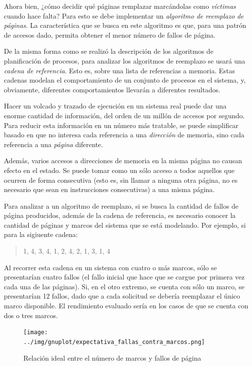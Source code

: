 \documentclass[11pt,fleqn]{book} %
\begin{document}
Ahora bien, ¿cómo decidir qué páginas remplazar marcándolas como
\emph{víctimas} cuando hace falta? Para esto se debe implementar un
\emph{algoritmo de reemplazo de páginas}. La característica que se busca en
este algoritmo es que, para una patrón de accesos dado, permita obtener el
menor número de fallos de página.

De la misma forma como se realizó la descripción de los algoritmos de
planificación de procesos, para analizar los algoritmos de reemplazo 
se usará una \emph{cadena de referencia}. Esto es, sobre una lista
de referencias a memoria. Estas cadenas modelan el
comportamiento de un conjunto de procesos en el sistema, y,
obviamente, diferentes comportamientos llevarán a diferentes
resultados.

Hacer un volcado y trazado de ejecución en un sistema real puede dar
una enorme cantidad de información, del orden de un millón de accesos
por segundo. Para reducir esta información en un número más tratable,
se puede simplificar basado en que no interesa cada referencia a una \emph{dirección} 
de memoria,  sino cada referencia a una \emph{página} diferente.

Además, varios accesos a direcciones de memoria en la misma página no
causan efecto en el estado. Se puede tomar como un sólo acceso a todos
aquellos que ocurren de forma consecutiva (esto es, sin llamar a
ninguna otra página, no es necesario que sean en instrucciones
consecutivas) a una misma página.

Para analizar a un algoritmo de reemplazo, si se busca la
cantidad de fallos de página producidos, además de la cadena de
referencia, es necesario conocer la cantidad de páginas y marcos
del sistema que se está modelando. Por ejemplo, si para
la sigiuente cadena:

\begin{quote}
1, 4, 3, 4, 1, 2, 4, 2, 1, 3, 1, 4
\end{quote}

Al recorrer esta cadena en un sistema con cuatro o más marcos,
sólo se presentarían cuatro fallos (el fallo inicial que hace
que se cargue por primera vez cada una de las páginas). Si, en el otro
extremo, se cuenta con sólo un marco, se presentarían 12 fallos,
dado que a cada solicitud se debería reemplazar el único marco
disponible. El rendimiento evaluado sería en los casos de que se cuenta
con dos o tres marcos.

\begin{figure}[htb]
\centering
\texttt{[image: ../img/gnuplot/expectativa\_fallas\_contra\_marcos.png]}
\caption{\label{MEM_expectativa_fallas_marcos}Relación ideal entre el número de marcos y fallos de página}
\end{figure}
\end{document}
